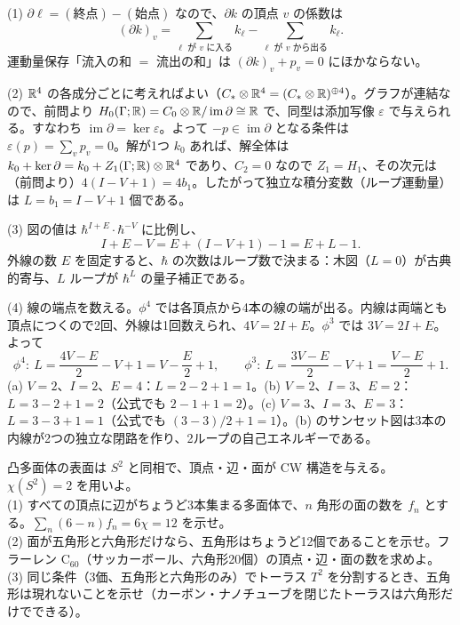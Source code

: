 \begin{solution}
(1) $\partial\ell=(\text{終点})-(\text{始点})$ なので、$\partial k$ の頂点 $v$ の係数は
\[
(\partial k)_v=\sum_{\ell\text{ が }v\text{ に入る}}k_\ell-\sum_{\ell\text{ が }v\text{ から出る}}k_\ell .
\]
運動量保存「流入の和 $=$ 流出の和」は $(\partial k)_v+p_v=0$ にほかならない。

(2) $\mathbb{R}^4$ の各成分ごとに考えればよい（$C_*\otimes\mathbb{R}^4=(C_*\otimes\mathbb{R})^{\oplus4}$）。グラフが連結なので、前問より $H_0(\Gamma;\mathbb{R})=C_0\otimes\mathbb{R}/\operatorname{im}\partial\cong\mathbb{R}$ で、同型は添加写像 $\varepsilon$ で与えられる。すなわち $\operatorname{im}\partial=\ker\varepsilon$。よって $-p\in\operatorname{im}\partial$ となる条件は $\varepsilon(p)=\sum_vp_v=0$。解が1つ $k_0$ あれば、解全体は $k_0+\ker\partial=k_0+Z_1(\Gamma;\mathbb{R})\otimes\mathbb{R}^4$ であり、$C_2=0$ なので $Z_1=H_1$、その次元は（前問より）$4(I-V+1)=4b_1$。したがって独立な積分変数（ループ運動量）は $L=b_1=I-V+1$ 個である。

(3) 図の値は $\hbar^{I+E}\cdot\hbar^{-V}$ に比例し、
\[
I+E-V=E+(I-V+1)-1=E+L-1 .
\]
外線の数 $E$ を固定すると、$\hbar$ の次数はループ数で決まる：木図（$L=0$）が古典的寄与、$L$ ループが $\hbar^L$ の量子補正である。

(4) 線の端点を数える。$\phi^4$ では各頂点から4本の線の端が出る。内線は両端とも頂点につくので2回、外線は1回数えられ、$4V=2I+E$。$\phi^3$ では $3V=2I+E$。よって
\[
\phi^4:\ L=\frac{4V-E}{2}-V+1=V-\frac E2+1,\qquad\phi^3:\ L=\frac{3V-E}{2}-V+1=\frac{V-E}{2}+1 .
\]
(a) $V=2$、$I=2$、$E=4$：$L=2-2+1=1$。(b) $V=2$、$I=3$、$E=2$：$L=3-2+1=2$（公式でも $2-1+1=2$）。(c) $V=3$、$I=3$、$E=3$：$L=3-3+1=1$（公式でも $(3-3)/2+1=1$）。(b) のサンセット図は3本の内線が2つの独立な閉路を作り、2ループの自己エネルギーである。
\end{solution}

\begin{problem}[難易度 A]\label{ch04-prob-c60}
凸多面体の表面は $S^2$ と同相で、頂点・辺・面が CW 構造を与える。$\chi(S^2)=2$ を用いよ。\\
(1) すべての頂点に辺がちょうど3本集まる多面体で、$n$ 角形の面の数を $f_n$ とする。$\sum_n(6-n)f_n=6\chi=12$ を示せ。\\
(2) 面が五角形と六角形だけなら、五角形はちょうど12個であることを示せ。フラーレン $\mathrm{C}_{60}$（サッカーボール、六角形20個）の頂点・辺・面の数を求めよ。\\
(3) 同じ条件（3価、五角形と六角形のみ）でトーラス $T^2$ を分割するとき、五角形は現れないことを示せ（カーボン・ナノチューブを閉じたトーラスは六角形だけでできる）。
\end{problem}

